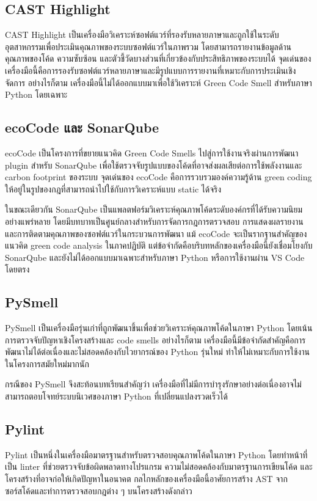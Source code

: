 \subsection{CAST Highlight}
{\boldfont CAST Highlight} เป็นเครื่องมือวิเคราะห์ซอฟต์แวร์ที่รองรับหลายภาษาและถูกใช้ในระดับอุตสาหกรรมเพื่อประเมินคุณภาพของระบบซอฟต์แวร์ในภาพรวม โดยสามารถรายงานข้อมูลด้านคุณภาพของโค้ด ความซับซ้อน และตัวชี้วัดบางส่วนที่เกี่ยวข้องกับประสิทธิภาพของระบบได้ จุดเด่นของเครื่องมือนี้คือการรองรับซอฟต์แวร์หลายภาษาและมีรูปแบบการรายงานที่เหมาะกับการประเมินเชิงจัดการ อย่างไรก็ตาม เครื่องมือนี้ไม่ได้ออกแบบมาเพื่อใช้วิเคราะห์ {\italicfont Green Code Smell} สำหรับภาษา Python โดยเฉพาะ

\subsection{ecoCode และ SonarQube}
{\boldfont ecoCode} เป็นโครงการที่ขยายแนวคิด {\italicfont Green Code Smells} ไปสู่การใช้งานจริงผ่านการพัฒนา {\italicfont plugin} สำหรับ {\boldfont SonarQube} เพื่อใช้ตรวจจับรูปแบบของโค้ดที่อาจส่งผลเสียต่อการใช้พลังงานและ {\italicfont carbon footprint} ของระบบ จุดเด่นของ ecoCode คือการรวบรวมองค์ความรู้ด้าน {\italicfont green coding} ให้อยู่ในรูปของกฎที่สามารถนำไปใช้กับการวิเคราะห์แบบ {\italicfont static} ได้จริง

ในขณะเดียวกัน {\boldfont SonarQube} เป็นแพลตฟอร์มวิเคราะห์คุณภาพโค้ดระดับองค์กรที่ได้รับความนิยมอย่างแพร่หลาย โดยมีบทบาทเป็นศูนย์กลางสำหรับการจัดการกฎการตรวจสอบ การแสดงผลรายงาน และการติดตามคุณภาพของซอฟต์แวร์ในกระบวนการพัฒนา แม้ ecoCode จะเป็นรากฐานสำคัญของแนวคิด {\italicfont green code analysis} ในภาคปฏิบัติ แต่ข้อจำกัดคือบริบทหลักของเครื่องมือนี้ยังเชื่อมโยงกับ SonarQube และยังไม่ได้ออกแบบมาเฉพาะสำหรับภาษา Python หรือการใช้งานผ่าน VS Code โดยตรง

\subsection{PySmell}
{\boldfont PySmell} เป็นเครื่องมือรุ่นเก่าที่ถูกพัฒนาขึ้นเพื่อช่วยวิเคราะห์คุณภาพโค้ดในภาษา Python โดยเน้นการตรวจจับปัญหาเชิงโครงสร้างและ {\italicfont code smells} อย่างไรก็ตาม เครื่องมือนี้มีข้อจำกัดสำคัญคือการพัฒนาไม่ได้ต่อเนื่องและไม่สอดคล้องกับไวยากรณ์ของ Python รุ่นใหม่ ทำให้ไม่เหมาะกับการใช้งานในโครงการสมัยใหม่มากนัก

กรณีของ PySmell จึงสะท้อนบทเรียนสำคัญว่า เครื่องมือที่ไม่มีการบำรุงรักษาอย่างต่อเนื่องอาจไม่สามารถตอบโจทย์ระบบนิเวศของภาษา Python ที่เปลี่ยนแปลงรวดเร็วได้

\subsection{Pylint}
{\boldfont Pylint} เป็นหนึ่งในเครื่องมือมาตรฐานสำหรับตรวจสอบคุณภาพโค้ดในภาษา Python โดยทำหน้าที่เป็น {\italicfont linter} ที่ช่วยตรวจจับข้อผิดพลาดทางโปรแกรม ความไม่สอดคล้องกับมาตรฐานการเขียนโค้ด และโครงสร้างที่อาจก่อให้เกิดปัญหาในอนาคต กลไกหลักของเครื่องมือนี้อาศัยการสร้าง AST จากซอร์สโค้ดและทำการตรวจสอบกฎต่าง ๆ บนโครงสร้างดังกล่าว

